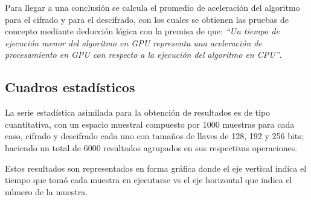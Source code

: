 \documentclass[../main/main.tex]{subfiles}
\begin{document}
  Para llegar a una conclusión se calcula el promedio de aceleración del algoritmo para el cifrado y para el descifrado, con los cuales se obtienen las pruebas de concepto mediante deducción lógica con la premisa de que: \textit{``Un tiempo de ejecución menor del algoritmo en GPU representa una aceleración de procesamiento en GPU con respecto a la ejecución del algoritmo en CPU''}.

  \subsection{Cuadros estadísticos}

  La serie estadística asimilada para la obtención de resultados es de tipo cuantitativa, con un espacio muestral compuesto por 1000 muestras para cada caso, cifrado y descifrado cada uno con tamaños de llaves de 128, 192 y 256 bits; haciendo un total de 6000 resultados agrupados en sus respectivas operaciones.

  Estos resultados son representados en forma gráfica donde el eje vertical indica el tiempo que tomó cada muestra en ejecutarse vs el eje horizontal que indica el número de la muestra.
\end{document}
